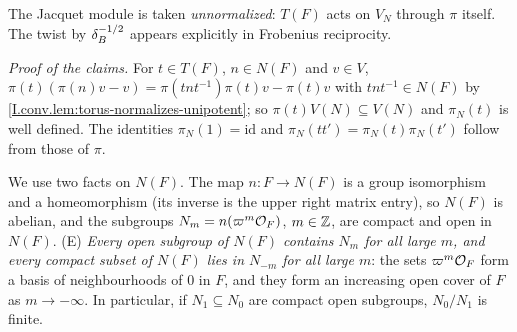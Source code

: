 The Jacquet module is taken \emph{unnormalized}: $T(F)$ acts on $V_N$ through $\pi$ itself. The twist by
$\delta_B^{-1/2}$ appears explicitly in Frobenius reciprocity.

\begin{definition}
\end{definition}

\noindent\emph{Proof of the claims.} For $t\in T(F)$, $n\in N(F)$ and $v\in V$,
$\pi(t)(\pi(n)v-v)=\pi(tnt^{-1})\pi(t)v-\pi(t)v$ with $tnt^{-1}\in N(F)$ by
\cref{I.conv.lem:torus-normalizes-unipotent}; so $\pi(t)V(N)\subseteq V(N)$ and $\pi_N(t)$ is well defined. The
identities $\pi_N(1)=\mathrm{id}$ and $\pi_N(tt')=\pi_N(t)\pi_N(t')$ follow from those of $\pi$.

\noindent We use two facts on $N(F)$. The map $n\colon F\to N(F)$ is a group isomorphism and a homeomorphism (its
inverse is the upper right matrix entry), so $N(F)$ is abelian, and the subgroups $N_m=n(\varpi^m\mathcal{O}_F)$, $m\in\mathbb{Z}$,
are compact and open in $N(F)$. (E) \emph{Every open subgroup of $N(F)$ contains $N_m$ for all large $m$, and every
compact subset of $N(F)$ lies in $N_{-m}$ for all large $m$}: the sets $\varpi^m\mathcal{O}_F$ form a basis of
neighbourhoods of $0$ in $F$, and they form an increasing open cover of $F$ as $m\to-\infty$. In particular, if $N_1\subseteq N_0$
are compact open subgroups, $N_0/N_1$ is finite.

